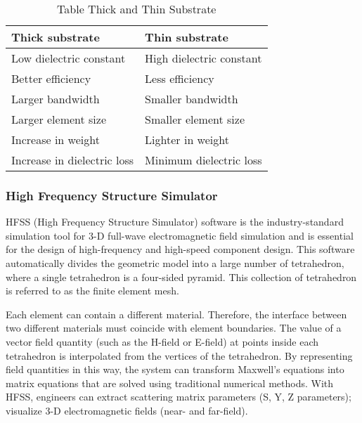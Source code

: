 		            \begin{center}
		            	\begin{table}[H]
		            		\centering
		            		\begin{tabular}{ |l|l|}
		            			\hline
		            			Thick substrate &	Thin substrate \\ \hline
		            			Low dielectric constant & High dielectric constant  \\ \hline
		            			Better efficiency &	Less efficiency  \\ \hline
		            			Larger bandwidth &	Smaller bandwidth  \\ \hline
		            			Larger element size & Smaller element size  \\ \hline
		            			Increase in weight &	Lighter in weight  \\ \hline
		            			Increase in dielectric loss &	Minimum dielectric loss  \\ \hline


		            		\end{tabular}
		            				            	\caption{Table Thick and Thin  Substrate }
		            	\end{table}

		            \end{center}

	           \subsubsection{High Frequency Structure Simulator }
	            \justify
	                HFSS (High Frequency Structure Simulator) software is the industry-standard simulation tool for 3-D full-wave electromagnetic field simulation and is essential for the design of high-frequency and high-speed component design. This software automatically divides the geometric model into a large number of tetrahedron, where a single tetrahedron is a four-sided pyramid. This collection of tetrahedron is referred to as the finite element mesh. 
	                
	                Each element can contain a different material. Therefore, the interface between two different materials must coincide with element boundaries. The value of a vector field quantity (such as the H-field or E-field) at points inside each tetrahedron is interpolated from the vertices of the tetrahedron. By representing field quantities in this way, the system can transform Maxwell's equations into matrix equations that are solved using traditional numerical methods. With HFSS, engineers can extract scattering matrix parameters (S, Y, Z parameters); visualize 3-D electromagnetic fields (near- and far-field).

